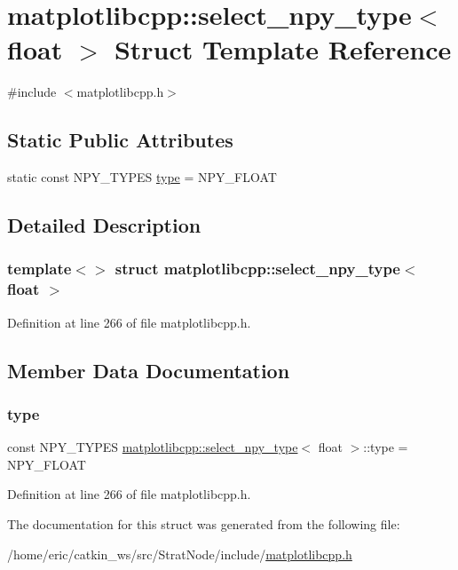 \hypertarget{structmatplotlibcpp_1_1select__npy__type_3_01float_01_4}{}\section{matplotlibcpp\+::select\+\_\+npy\+\_\+type$<$ float $>$ Struct Template Reference}
\label{structmatplotlibcpp_1_1select__npy__type_3_01float_01_4}


{\ttfamily \#include $<$matplotlibcpp.\+h$>$}

\subsection*{Static Public Attributes}
\begin{DoxyCompactItemize}
\item 
static const N\+P\+Y\+\_\+\+T\+Y\+P\+ES \mbox{\hyperlink{structmatplotlibcpp_1_1select__npy__type_3_01float_01_4_a7bca025a3f0cb143e566e0f575bf7f6b}{type}} = N\+P\+Y\+\_\+\+F\+L\+O\+AT
\end{DoxyCompactItemize}


\subsection{Detailed Description}
\subsubsection*{template$<$$>$\newline
struct matplotlibcpp\+::select\+\_\+npy\+\_\+type$<$ float $>$}



Definition at line 266 of file matplotlibcpp.\+h.



\subsection{Member Data Documentation}
\mbox{\label{structmatplotlibcpp_1_1select__npy__type_3_01float_01_4_a7bca025a3f0cb143e566e0f575bf7f6b}} 
\subsubsection{\texorpdfstring{type}{type}}
{\footnotesize\ttfamily const N\+P\+Y\+\_\+\+T\+Y\+P\+ES \mbox{\hyperlink{structmatplotlibcpp_1_1select__npy__type}{matplotlibcpp\+::select\+\_\+npy\+\_\+type}}$<$ float $>$\+::type = N\+P\+Y\+\_\+\+F\+L\+O\+AT\hspace{0.3cm}{\ttfamily [static]}}



Definition at line 266 of file matplotlibcpp.\+h.



The documentation for this struct was generated from the following file\+:\begin{DoxyCompactItemize}
\item 
/home/eric/catkin\+\_\+ws/src/\+Strat\+Node/include/\mbox{\hyperlink{matplotlibcpp_8h}{matplotlibcpp.\+h}}\end{DoxyCompactItemize}
